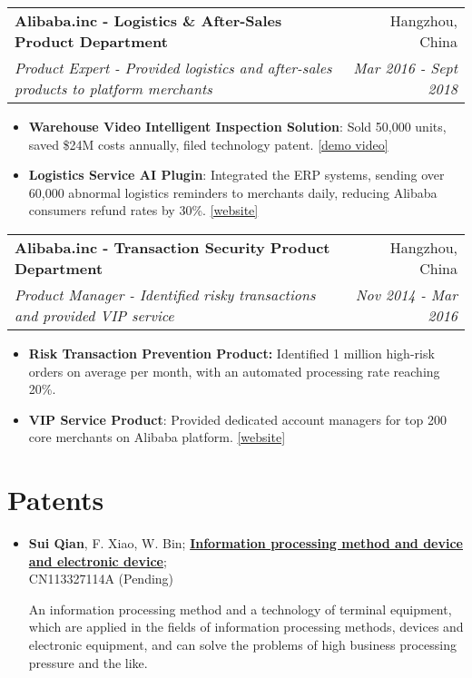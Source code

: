\documentclass[letterpaper,11pt]{article}
\makeatletter
\newcommand{\resumeSubheading}[4]{
  \vspace{-3pt}\item
    \begin{tabular*}{0.97\textwidth}{l@{\extracolsep{\fill}}r}
      \textbf{#1} & #2 \\
      \textit{\small#3} & \textit{\small #4} \\
    \end{tabular*}\vspace{-8pt}
}
\newcommand{\resumeSubHeadingListEnd}{}
\newcommand{\resumeItemListStart}{\begin{itemize}}
\newcommand{\resumeItemListEnd}{\end{itemize}\vspace{-8pt}}
\makeatother
\begin{document}
\resumeSubheading {Alibaba.inc - Logistics \& After-Sales Product Department
}{Hangzhou, China} {Product Expert - Provided logistics and after-sales products to platform merchants}{Mar 2016 - Sept 2018}
      \resumeItemListStart
      \item {{\textbf{Warehouse Video Intelligent Inspection Solution}:}}
      {Sold 50,000 units, saved \$24M costs annually, filed technology patent. \href{https://gtxwsy.yuque.com/gtxwsy/miv5ag/ih3dqq?}{[demo video]}}
          \vspace{-5pt}
       \item {\textbf{Logistics Service AI Plugin}:}
      {Integrated the ERP systems, sending over 60,000 abnormal logistics reminders to merchants daily, reducing Alibaba consumers refund rates by 30\%. \href{https://aligenius.taobao.com/}{[website]}}
      \resumeItemListEnd      
\vspace{5pt}

\resumeSubheading
      {Alibaba.inc - Transaction Security Product Department}{Hangzhou, China} {Product Manager - Identified risky transactions and provided VIP  service}{Nov 2014 - Mar 2016}
      \resumeItemListStart
      \item {\textbf{Risk Transaction Prevention Product:}}
      {Identified 1 million high-risk orders on average per month, with an automated processing rate reaching 20\%. }
        \vspace{-5pt}
       \item {\textbf{VIP Service Product}:}
      {Provided dedicated account managers for top 200 core merchants on Alibaba platform. \href{http://alikey.tmall.com/}{[website]}}
      \resumeItemListEnd

\resumeSubHeadingListEnd
\vspace{5pt}

\section{Patents}
\begin{itemize}[leftmargin=*]
  \item {\textbf{Sui Qian}, F. Xiao, W. Bin; \textbf{\href{https://eureka.patsnap.com/patent-CN113327114A}{Information processing method and device and electronic device}}; {\\CN113327114A} (Pending)}
  
  {An information processing method and a technology of terminal equipment, which are applied in the fields of information processing methods, devices and electronic equipment, and can solve the problems of high business processing pressure and the like.}
\end{itemize}
\end{document}
